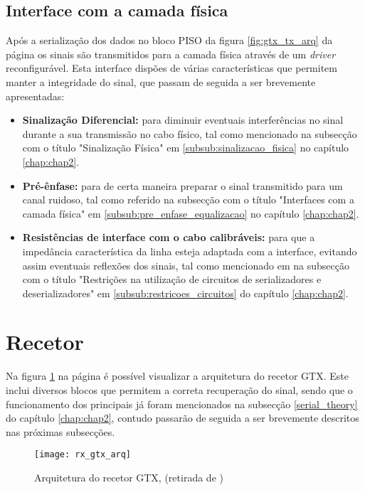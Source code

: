 \subsection{Interface com a camada física} 
Após a serialização dos dados no bloco PISO da figura \ref{fig:gtx_tx_arq} da página \pageref{fig:gtx_tx_arq} os sinais são transmitidos para a camada física através de um \textit{driver} reconfigurável. Esta interface dispões de várias características que permitem manter a integridade do sinal, que passam de seguida a ser brevemente apresentadas:
\begin{itemize}
	\item \textbf{Sinalização Diferencial:} para diminuir eventuais interferências no sinal durante a sua transmissão no cabo físico, tal como mencionado na subsecção com o título "Sinalização Física" em \ref{subsub:sinalizacao_fisica} no capítulo \ref{chap:chap2}.
	\item \textbf{Pré-ênfase:} para de certa maneira preparar o sinal transmitido para um canal ruidoso, tal como referido na subsecção com o título "Interfaces com a camada física" em \ref{subsub:pre_enfase_equalizacao} no capítulo \ref{chap:chap2}.
	\item \textbf{Resistências de interface com o cabo calibráveis:} para que a impedância característica da linha esteja adaptada com a interface, evitando assim eventuais reflexões dos sinais, tal como mencionado em na subsecção com o título "Restrições na utilização de circuitos de serializadores e deserializadores" em \ref{subsub:restricoes_circuitos} do capítulo \ref{chap:chap2}.
\end{itemize}


\section{Recetor} \label{sec:_rx_gtx}
Na figura \ref{fig:gtx_rx_arq} na página \pageref{fig:gtx_rx_arq} é possível visualizar a arquitetura do recetor GTX. Este inclui diversos blocos que permitem a correta recuperação do sinal, sendo que o funcionamento dos principais já foram mencionados na subsecção \ref{serial_theory} do capítulo \ref{chap:chap2}, contudo passarão de seguida a ser brevemente descritos nas próximas subsecções. 

\begin{figure}[h!]
	\begin{center}
		\leavevmode
		\texttt{[image: rx\_gtx\_arq]}
		\centering
		\caption[Arquitetura do recetor GTX]{Arquitetura do recetor GTX, (retirada de \cite{R011})}
		\label{fig:gtx_rx_arq}
	\end{center}
\end{figure}
	

